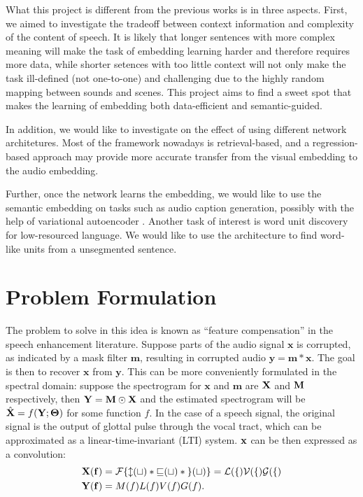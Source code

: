 \documentclass[a4paper]{article}
\begin{document}
What this project is different from the previous works is in three aspects. First, we aimed
to investigate the tradeoff between context
information and complexity of the content of
speech. It is likely that longer sentences
with more complex meaning will make the task of
embedding learning harder and therefore requires
more data, while shorter setences with too 
little context will not only make the task ill-defined (not one-to-one) and challenging
due to the highly random mapping between sounds
and scenes. This project aims to find a sweet
spot that makes the learning of embedding both data-efficient and semantic-guided.

In addition, we would like to investigate on
the effect of using different network 
architetures. Most of the framework nowadays is
retrieval-based, and a regression-based 
approach may provide more accurate transfer from the visual embedding to the audio embedding. 

Further, once the network learns the embedding,
we would like to use the semantic
embedding on tasks such as audio caption generation, possibly with the
help of variational autoencoder \cite{Kingma14}. Another task of interest is
 word unit discovery for low-resourced language. We would like to use the architecture
 to find word-like units from a unsegmented sentence. 

\section{Problem Formulation}
The problem to solve in this idea is known as ``feature compensation'' in
the speech enhancement literature. Suppose parts of the audio signal $\mathbf{x}$ 
is corrupted, 
as indicated by
a mask filter $\mathbf{m}$, resulting in corrupted audio 
$\mathbf{y} = \mathbf{m} * \mathbf{x}$. The goal is then to recover 
$\mathbf{x}$ from $\mathbf{y}$. This can be more conveniently formulated 
in the spectral domain: suppose the spectrogram for $\mathbf{x}$ and $\mathbf{m}$
are $\bf{X}$ and $\bf{M}$ respectively, then $\bf{Y} = \bf{M} \odot \bf{X}$ and
the estimated spectrogram will be $\hat{\bf{X}} = f(\bf{Y}; \bf{\Theta})$ for
some function $f$. In the case of a speech signal, the original signal is the output of glottal pulse through the vocal tract, which can be approximated as a linear-time-invariant (LTI) system. $\bf{x}$ can be then expressed as a convolution:
\begin{align*}
    \bf{X}(f) &= \cal{F}\{l(t) * v(t) * g(t)\} = L(f)V(f)G(f)\\
    \bf{Y}(f) &= M(f)L(f)V(f)G(f). 
\end{align*}
\end{document}

